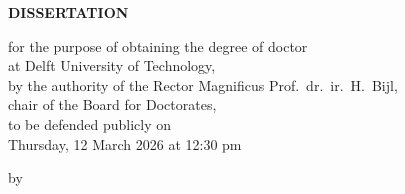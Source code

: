\begin{titlepage}

\begin{center}

\vspace*{2\bigskipamount}

{\makeatletter
\titlestyle\bfseries\LARGE\@title
\makeatother}

{\makeatletter
\ifx\@subtitle\undefined\else
    \bigskip
    \titlefont\titleshape\Large\@subtitle
\fi
\makeatother}

\end{center}

\cleardoublepage
\thispagestyle{empty}

\begin{center}


\vspace*{4\bigskipamount}

{\makeatletter
\titlestyle\bfseries\LARGE\@title
\makeatother}

{\makeatletter
\ifx\@subtitle\undefined\else
    \bigskip
    \titlefont\titleshape\Large\@subtitle
\fi
\makeatother}


\bigskip
\bigskip
\bigskip
\bigskip
\bigskip
\bigskip
\bigskip
\bigskip


{\Large\titlefont\bfseries DISSERTATION}

\bigskip

for the purpose of obtaining the degree of doctor\\
at Delft University of Technology,\\
by the authority of the Rector Magnificus Prof.~dr.~ir.~H.~Bijl,\\
chair of the Board for Doctorates,\\
to be defended publicly on\\
Thursday, 12 March 2026 at 12:30 pm

\bigskip
\bigskip
\bigskip
\bigskip
\bigskip
\bigskip

by


\end{center}
\end{titlepage}
